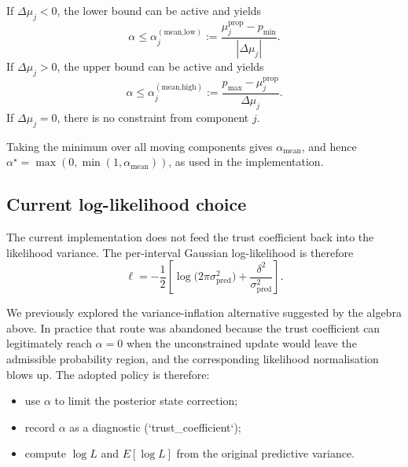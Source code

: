 \documentclass[11pt]{article}
\begin{document}
If \(\Delta\mu_j < 0\), the lower bound can be active and yields
\[
  \alpha
  \le
  \alpha^{(\text{mean,low})}_j
  :=
  \frac{\mu^{\text{prop}}_j - p_{\min}}{|\Delta\mu_j|}.
\]
If \(\Delta\mu_j > 0\), the upper bound can be active and yields
\[
  \alpha
  \le
  \alpha^{(\text{mean,high})}_j
  :=
  \frac{p_{\max} - \mu^{\text{prop}}_j}{\Delta\mu_j}.
\]
If \(\Delta\mu_j=0\), there is no constraint from component \(j\).

Taking the minimum over all moving components gives \(\alpha_{\text{mean}}\),
and hence \(\alpha^\star = \max(0,\min(1,\alpha_{\text{mean}}))\), as used in
the implementation.

\subsection{Current log-likelihood choice}

The current implementation does not feed the trust coefficient back into the
likelihood variance. The per-interval Gaussian log-likelihood is therefore
\[
  \ell
  =
  -\frac{1}{2}
  \left[
    \log\bigl(2\pi\sigma^2_{\text{pred}}\bigr)
    +
    \frac{\delta^2}{\sigma^2_{\text{pred}}}
  \right].
\]

We previously explored the variance-inflation alternative suggested by the
algebra above. In practice that route was abandoned because the trust
coefficient can legitimately reach \(\alpha=0\) when the unconstrained update
would leave the admissible probability region, and the corresponding
likelihood normalisation blows up. The adopted policy is therefore:
\begin{itemize}
  \item use \(\alpha\) to limit the posterior state correction;
  \item record \(\alpha\) as a diagnostic (`trust\_coefficient`);
  \item compute \(\log L\) and \(E[\log L]\) from the original predictive
        variance.
\end{itemize}
\end{document}
